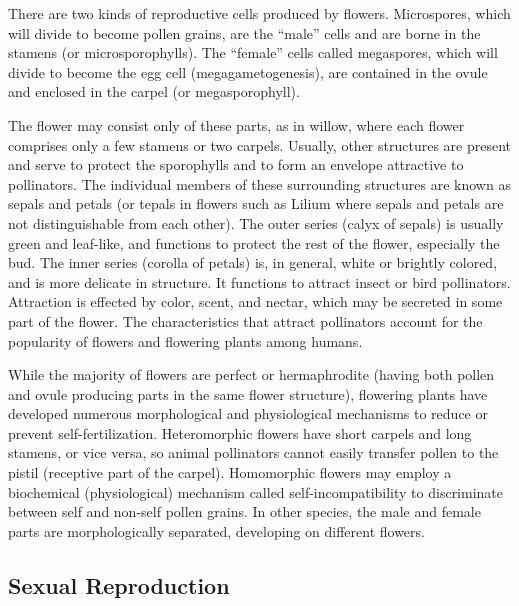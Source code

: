 \documentclass[]{book}
\theoremstyle{definition}
\theoremstyle{definition}
\theoremstyle{definition}
\theoremstyle{remark}
\begin{document}
There are two kinds of reproductive cells produced by flowers.
Microspores, which will divide to become pollen grains, are the ``male''
cells and are borne in the stamens (or microsporophylls). The ``female''
cells called megaspores, which will divide to become the egg cell
(megagametogenesis), are contained in the ovule and enclosed in the
carpel (or megasporophyll).

The flower may consist only of these parts, as in willow, where each
flower comprises only a few stamens or two carpels. Usually, other
structures are present and serve to protect the sporophylls and to form
an envelope attractive to pollinators. The individual members of these
surrounding structures are known as sepals and petals (or tepals in
flowers such as Lilium where sepals and petals are not distinguishable
from each other). The outer series (calyx of sepals) is usually green
and leaf-like, and functions to protect the rest of the flower,
especially the bud. The inner series (corolla of petals) is, in general,
white or brightly colored, and is more delicate in structure. It
functions to attract insect or bird pollinators. Attraction is effected
by color, scent, and nectar, which may be secreted in some part of the
flower. The characteristics that attract pollinators account for the
popularity of flowers and flowering plants among humans.

While the majority of flowers are perfect or hermaphrodite (having both
pollen and ovule producing parts in the same flower structure),
flowering plants have developed numerous morphological and physiological
mechanisms to reduce or prevent self-fertilization. Heteromorphic
flowers have short carpels and long stamens, or vice versa, so animal
pollinators cannot easily transfer pollen to the pistil (receptive part
of the carpel). Homomorphic flowers may employ a biochemical
(physiological) mechanism called self-incompatibility to discriminate
between self and non-self pollen grains. In other species, the male and
female parts are morphologically separated, developing on different
flowers.

\subsection{Sexual Reproduction}\label{sexual-reproduction}
\end{document}
